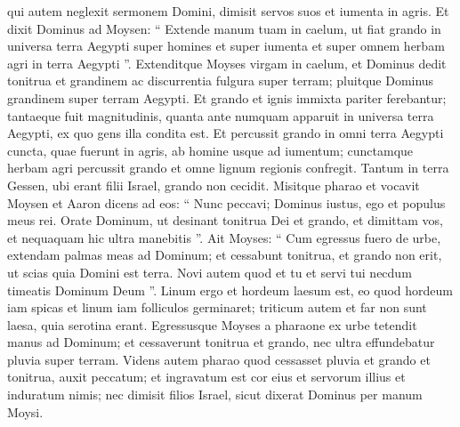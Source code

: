 \begin{biblechapter}
\begin{biblechapter}
\begin{biblechapter}
\begin{biblechapter}
\begin{biblechapter}
\begin{biblechapter}
\begin{biblechapter}
\begin{biblechapter}
\begin{biblechapter}
\verse qui autem neglexit sermonem Domini, dimisit servos suos et iumenta in agris.
 \verse Et dixit Dominus ad Moysen: “ Extende manum tuam in caelum, ut fiat grando in universa terra Aegypti super homines et super iumenta et super omnem herbam agri in terra Aegypti ”. 
\verse Extenditque Moyses virgam in caelum, et Dominus dedit tonitrua et grandinem ac discurrentia fulgura super terram; pluitque Dominus grandinem super terram Aegypti. 
\verse Et grando et ignis immixta pariter ferebantur; tantaeque fuit magnitudinis, quanta ante numquam apparuit in universa terra Aegypti, ex quo gens illa condita est. 
\verse Et percussit grando in omni terra Aegypti cuncta, quae fuerunt in agris, ab homine usque ad iumentum; cunctamque herbam agri percussit grando et omne lignum regionis confregit. 
\verse Tantum in terra Gessen, ubi erant filii Israel, grando non cecidit.
 \verse Misitque pharao et vocavit Moysen et Aaron dicens ad eos: “ Nunc peccavi; Dominus iustus, ego et populus meus rei. 
 \verse Orate Dominum, ut desinant tonitrua Dei et grando, et dimittam vos, et nequaquam hic ultra manebitis ”. 
 \verse Ait Moyses: “ Cum egressus fuero de urbe, extendam palmas meas ad Dominum; et cessabunt tonitrua, et grando non erit, ut scias quia Domini est terra. 
 \verse Novi autem quod et tu et servi tui necdum timeatis Dominum Deum ”. 
 \verse Linum ergo et hordeum laesum est, eo quod hordeum iam spicas et linum iam folliculos germinaret; 
 \verse triticum autem et far non sunt laesa, quia serotina erant.
 \verse Egressusque Moyses a pharaone ex urbe tetendit manus ad Dominum; et cessaverunt tonitrua et grando, nec ultra effundebatur pluvia super terram. 
 \verse Videns autem pharao quod cessasset pluvia et grando et tonitrua, auxit peccatum; 
 \verse et ingravatum est cor eius et servorum illius et induratum nimis; nec dimisit filios Israel, sicut dixerat Dominus per manum Moysi.
 

\end{biblechapter}
\end{biblechapter}
\end{biblechapter}
\end{biblechapter}
\end{biblechapter}
\end{biblechapter}
\end{biblechapter}
\end{biblechapter}
\end{biblechapter}
